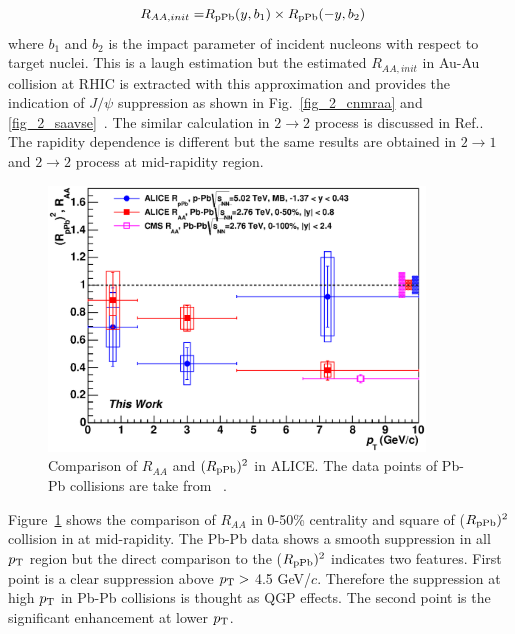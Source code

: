 \begin{eqnarray}
	R_{AA, init} = & R_{\rm{pPb}}(y, b_{1})\times R_{\rm{pPb}}(-y, b_{2})
\end{eqnarray}
where $b_{1}$ and $b_{2}$ is the impact parameter of incident nucleons with respect to target nuclei.  
This is a laugh estimation but the estimated $R_{AA, init}$ in Au-Au collision at RHIC is extracted with this approximation and provides the indication of $J/\psi$ suppression as shown in Fig.~\ref{fig_2_cnmraa} and \ref{fig_2_saavse}~\cite{bib_daucorr}.
The similar calculation in $2\rightarrow2$ process is discussed in Ref.\cite{bib_shadowf}. 
The rapidity dependence is different but the same results are obtained in  $2\rightarrow1$ and $2\rightarrow2$ process at mid-rapidity region.
\begin{figure}[!h]
  \centering
  \includegraphics[width=10cm]{chap5/figure/SAA/JpsiRpbRpb_bin2_tw.eps}
  \caption{
  Comparison of $R_{AA}$ and $(R_{\rm{pPb}})^{2}$ in ALICE. The data points of Pb-Pb collisions are take from ~\cite{bib_alicejpsiraamid}. 	
  }
  \label{fig_5_rppbrppb}
\end{figure}
Figure~\ref{fig_5_rppbrppb} shows the comparison of $R_{AA}$ in 0-50\% centrality and square of ($R_{\rm{pPb}})^{2}$ collision in at mid-rapidity.
The Pb-Pb data shows a smooth suppression in all $p_{\rm{T}}$ region but the direct comparison to the ($R_{\rm{pPb}})^{2}$ indicates two features. 
First point is a clear suppression above $p_{\rm{T}}>$ 4.5 GeV/$c$. 
Therefore the suppression at high $p_{\rm{T}}$ in Pb-Pb collisions is thought as QGP effects.
The second point is the significant enhancement at lower $p_{\rm{T}}$. 
